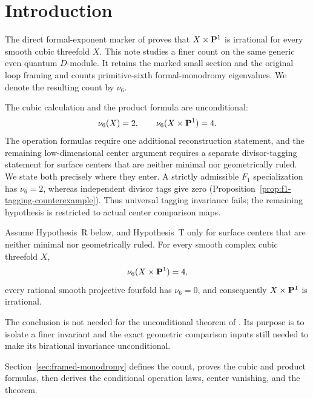 \section{Introduction}

The direct formal-exponent marker of \cite{RuddM1} proves that
\(X\times\mathbf P^1\) is irrational for every smooth cubic threefold \(X\).
This note studies a finer count on the same generic even quantum
\(D\)-module.  It retains the marked small section and the original loop
framing and counts primitive-sixth formal-monodromy eigenvalues.  We denote
the resulting count by \(\nu_6\).

The cubic calculation and the product formula are unconditional:
\[
 \nu_6(X)=2,\qquad \nu_6(X\times\mathbf P^1)=4.
\]
The operation formulas require one additional reconstruction statement, and
the remaining low-dimensional center argument requires a separate
divisor-tagging statement for surface centers that are neither minimal nor
geometrically ruled.  We state both precisely where they enter. A strictly admissible \(F_1\)
specialization has \(\nu_6=2\), whereas independent divisor tags give zero
(Proposition~\ref{prop:f1-tagging-counterexample}). Thus universal tagging
invariance fails; the remaining hypothesis is restricted to actual center
comparison maps.

\begin{theorem}
\label{thm:every-cubic-conditional}
%
%
Assume Hypothesis~R below, and Hypothesis~T only for surface centers
that are neither minimal nor geometrically ruled.  For every smooth complex
cubic threefold \(X\),
\[
 \nu_6(X\times\mathbf P^1)=4,
\]
every rational smooth projective fourfold has \(\nu_6=0\), and consequently
\(X\times\mathbf P^1\) is irrational.
\end{theorem}

The conclusion is not needed for the unconditional theorem of
\cite{RuddM1}.  Its purpose is to isolate a finer invariant and the exact
geometric comparison inputs still needed to make its birational invariance
unconditional.

Section~\ref{sec:framed-monodromy} defines the count, proves the
cubic and product formulas, then derives the conditional operation laws,
center vanishing, and the theorem.
